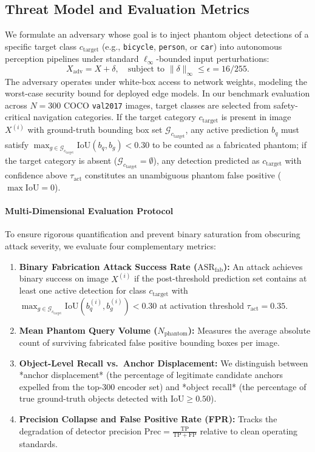 \documentclass[preprint,12pt]{elsarticle}
\begin{document}
\subsection{Threat Model and Evaluation Metrics}
We formulate an adversary whose goal is to inject phantom object detections of a specific target class $c_{\mathrm{target}}$ (e.g., \texttt{bicycle}, \texttt{person}, or \texttt{car}) into autonomous perception pipelines under standard $\ell_\infty$-bounded input perturbations:
\begin{equation}
    X_{\mathrm{adv}} = X + \delta, \quad \text{subject to } \|\delta\|_\infty \le \epsilon = 16/255.
\end{equation}
The adversary operates under white-box access to network weights, modeling the worst-case security bound for deployed edge models. In our benchmark evaluation across $N=300$ COCO \texttt{val2017} images, target classes are selected from safety-critical navigation categories. If the target category $c_{\mathrm{target}}$ is present in image $X^{(i)}$ with ground-truth bounding box set $\mathcal{G}_{c_{\mathrm{target}}}$, any active prediction $b_q$ must satisfy $\max_{g \in \mathcal{G}_{c_{\mathrm{target}}}} \mathrm{IoU}(b_q, b_g) < 0.30$ to be counted as a fabricated phantom; if the target category is absent ($\mathcal{G}_{c_{\mathrm{target}}} = \emptyset$), any detection predicted as $c_{\mathrm{target}}$ with confidence above $\tau_{\mathrm{act}}$ constitutes an unambiguous phantom false positive ($\max \mathrm{IoU} = 0$).

\paragraph{Multi-Dimensional Evaluation Protocol}
To ensure rigorous quantification and prevent binary saturation from obscuring attack severity, we evaluate four complementary metrics:
\begin{enumerate}
    \item \textbf{Binary Fabrication Attack Success Rate ($\mathrm{ASR}_{\mathrm{fab}}$):} An attack achieves binary success on image $X^{(i)}$ if the post-threshold prediction set contains at least one active detection for class $c_{\mathrm{target}}$ with $\max_{g \in \mathcal{G}_{c_{\mathrm{target}}}} \mathrm{IoU}(b_q^{(i)}, b_g^{(i)}) < 0.30$ at activation threshold $\tau_{\mathrm{act}} = 0.35$.
    \item \textbf{Mean Phantom Query Volume ($N_{\mathrm{phantom}}$):} Measures the average absolute count of surviving fabricated false positive bounding boxes per image.
    \item \textbf{Object-Level Recall vs.\ Anchor Displacement:} We distinguish between *anchor displacement* (the percentage of legitimate candidate anchors expelled from the top-300 encoder set) and *object recall* (the percentage of true ground-truth objects detected with $\mathrm{IoU} \ge 0.50$).
    \item \textbf{Precision Collapse and False Positive Rate (FPR):} Tracks the degradation of detector precision $\mathrm{Prec} = \frac{\mathrm{TP}}{\mathrm{TP} + \mathrm{FP}}$ relative to clean operating standards.
\end{enumerate}
\end{document}
